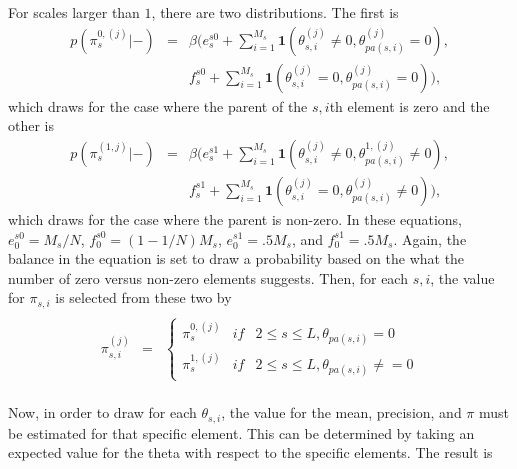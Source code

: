 \documentclass{IEEEtran}
\begin{document}
For scales larger than $1$, there are two distributions.  The first is
\begin{equation}
  \begin{array}{ccc}
    p(\pi_s^{0,(j)}|-) & = &
    \beta(e_s^{s0}+\sum_{i=1}^{M_s}\mathbf{1}(\theta_{s,i}^{(j)}\neq
    0,\theta_{pa(s,i)}^{(j)}= 0), \\
    & & f_s^{s0} +\sum_{i=1}^{M_s}\mathbf{1}(\theta_{s,i}^{(j)}=
    0,\theta_{pa(s,i)}^{(j)}= 0)),
  \end{array}
\label{pir0}
\end{equation}
which draws for the case where the parent of the $s,i$th element is
zero and the other is
\begin{equation}
  \begin{array}{ccc}
    p(\pi_s^{(1,j)}|-) & = & 
    \beta(e_s^{s1}+\sum_{i=1}^{M_s}\mathbf{1}(\theta_{s,i}^{(j)}\neq
    0,\theta_{pa(s,i)}^{1,(j)}\neq 0), \\
    & & f_s^{s1}+\sum_{i=1}^{M_s}\mathbf{1}(\theta_{s,i}^{(j)}=
    0,\theta_{pa(s,i)}^{(j)}\neq 0)),
  \end{array}
\label{pi0}
\end{equation}
which draws for the case where the parent is non-zero.  In these
equations, $e_0^{s0} = M_s/N$, $f_0^{s0} = (1-1/N)M_s$, $e_0^{s1} =
.5M_s$, and $f_0^{s1} = .5M_s$. Again, the
balance in the equation is set to draw a probability based on the what
the number of zero versus non-zero elements suggests.  Then, for each
$s,i$, the value for $\pi_{s,i}$ is selected from these two by
\begin{equation}
  \begin{array}{ccc}
     
    & & \\
    \pi_{s,i}^{(j)} &= & \left\{ 
    \begin{array}{ccc}
      \pi_s^{0,(j)} & if & 2 \leq s \leq L, \theta_{pa(s,i)} = 0  \\ 
      \pi_s^{1,(j)} & if & 2 \leq s \leq L, \theta_{pa(s,i)} \neq= 0 
    \end{array} \right. \\
  \end{array}
\label{pichoose}
\end{equation}

Now, in order to draw for each $\theta_{s,i}$, the value for the mean,
precision, and $\pi$ must be estimated for that specific element.
This can be determined by taking an expected value for the theta with
respect to the specific elements.  The result is
\end{document}
